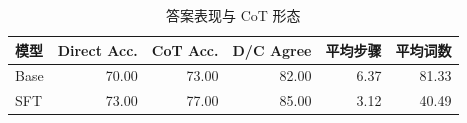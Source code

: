 \begin{table}[H]
\centering
\small
\caption{答案表现与 CoT 形态}
\label{tab:capability}
\begin{tabular}{lrrrrr}
\toprule
模型 & Direct Acc. & CoT Acc. & D/C Agree & 平均步骤 & 平均词数 \\
\midrule
Base & 70.00 & 73.00 & 82.00 & 6.37 & 81.33 \\
SFT & 73.00 & 77.00 & 85.00 & 3.12 & 40.49 \\
\bottomrule
\end{tabular}
\end{table}
